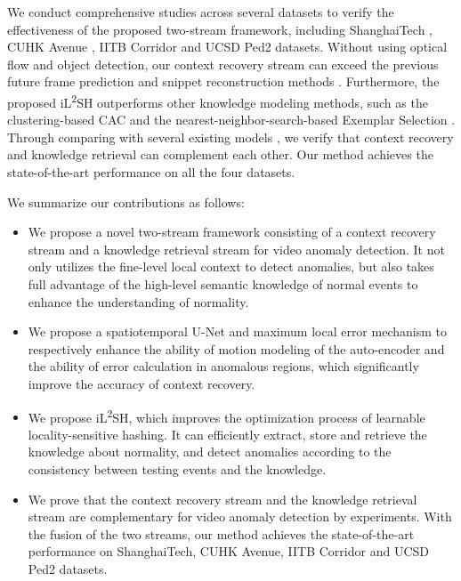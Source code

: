 \documentclass[lettersize,journal]{IEEEtran}
\begin{document}
We conduct comprehensive studies across several datasets to verify the effectiveness of the proposed two-stream framework, including ShanghaiTech \cite{RevisitSparse2017luoa}, CUHK Avenue \cite{AbnormalEvent2013lua}, IITB Corridor \cite{MultitimescaleTrajectory2020rodriguesa} and UCSD Ped2 \cite{AnomalyDetection2010mahadevan} datasets.
Without using optical flow and object detection, our context recovery stream can exceed the previous future frame prediction and snippet reconstruction methods \cite{FutureFrame2018liua, MemorizingNormality2019gonga, LearningMemoryGuided2020parka}.
Furthermore, the proposed iL\textsuperscript{2}SH outperforms other knowledge modeling methods, such as the clustering-based CAC \cite{ClusterAttention2020wanga} and the nearest-neighbor-search-based Exemplar Selection \cite{StreetScene2020ramachandraa}.
Through comparing with several existing models \cite{LearningMemoryGuided2020parka, LearningNormal2021lva, AppearanceMotionMemory2021caia, ClusterAttention2020wanga, StreetScene2020ramachandraa}, we verify that context recovery and knowledge retrieval can complement each other.
Our method achieves the state-of-the-art performance on all the four datasets.


We summarize our contributions as follows:
\begin{itemize}
	\item
	We propose a novel two-stream framework consisting of a context recovery stream and a knowledge retrieval stream for video anomaly detection.
	It not only utilizes the fine-level local context to detect anomalies, but also takes full advantage of the high-level semantic knowledge of normal events to enhance the understanding of normality.
	
	\item
	We propose a spatiotemporal U-Net and maximum local error mechanism to respectively enhance the ability of motion modeling of the auto-encoder and the ability of error calculation in anomalous regions, which significantly improve the accuracy of context recovery.

	\item
	We propose iL\textsuperscript{2}SH, which improves the optimization process of learnable locality-sensitive hashing.
	It can efficiently extract, store and retrieve the knowledge about normality, and detect anomalies according to the consistency between testing events and the knowledge.
	
	\item
	We prove that the context recovery stream and the knowledge retrieval stream are complementary for video anomaly detection by experiments.
	With the fusion of the two streams, our method achieves the state-of-the-art performance on ShanghaiTech, CUHK Avenue, IITB Corridor and UCSD Ped2 datasets.
	
\end{itemize}
\end{document}
